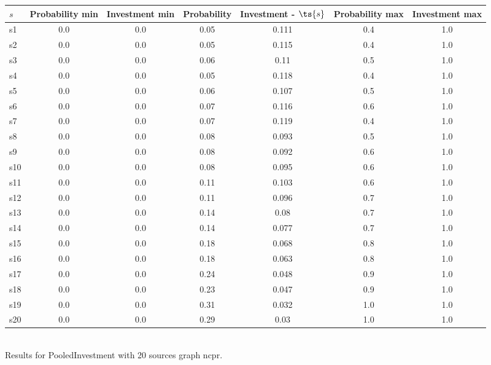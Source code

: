 \documentclass{article}
\begin{document}
\noindent\begin{tabular}{|l|c|c|c|c|c|c|}
\hline
$s$& Probability min & Investment min & Probability & Investment - $\ts{s}$ & Probability max & Investment max\\
\hline
s1 &0.0 & 0.0 & 0.05 & 0.111 & 0.4 & 1.0\\
\hline
s2 &0.0 & 0.0 & 0.05 & 0.115 & 0.4 & 1.0\\
\hline
s3 &0.0 & 0.0 & 0.06 & 0.11 & 0.5 & 1.0\\
\hline
s4 &0.0 & 0.0 & 0.05 & 0.118 & 0.4 & 1.0\\
\hline
s5 &0.0 & 0.0 & 0.06 & 0.107 & 0.5 & 1.0\\
\hline
s6 &0.0 & 0.0 & 0.07 & 0.116 & 0.6 & 1.0\\
\hline
s7 &0.0 & 0.0 & 0.07 & 0.119 & 0.4 & 1.0\\
\hline
s8 &0.0 & 0.0 & 0.08 & 0.093 & 0.5 & 1.0\\
\hline
s9 &0.0 & 0.0 & 0.08 & 0.092 & 0.6 & 1.0\\
\hline
s10 &0.0 & 0.0 & 0.08 & 0.095 & 0.6 & 1.0\\
\hline
s11 &0.0 & 0.0 & 0.11 & 0.103 & 0.6 & 1.0\\
\hline
s12 &0.0 & 0.0 & 0.11 & 0.096 & 0.7 & 1.0\\
\hline
s13 &0.0 & 0.0 & 0.14 & 0.08 & 0.7 & 1.0\\
\hline
s14 &0.0 & 0.0 & 0.14 & 0.077 & 0.7 & 1.0\\
\hline
s15 &0.0 & 0.0 & 0.18 & 0.068 & 0.8 & 1.0\\
\hline
s16 &0.0 & 0.0 & 0.18 & 0.063 & 0.8 & 1.0\\
\hline
s17 &0.0 & 0.0 & 0.24 & 0.048 & 0.9 & 1.0\\
\hline
s18 &0.0 & 0.0 & 0.23 & 0.047 & 0.9 & 1.0\\
\hline
s19 &0.0 & 0.0 & 0.31 & 0.032 & 1.0 & 1.0\\
\hline
s20 &0.0 & 0.0 & 0.29 & 0.03 & 1.0 & 1.0\\
\hline
\end{tabular}\\

\noindent Results for PooledInvestment with 20 sources graph ncpr.
\end{document}
